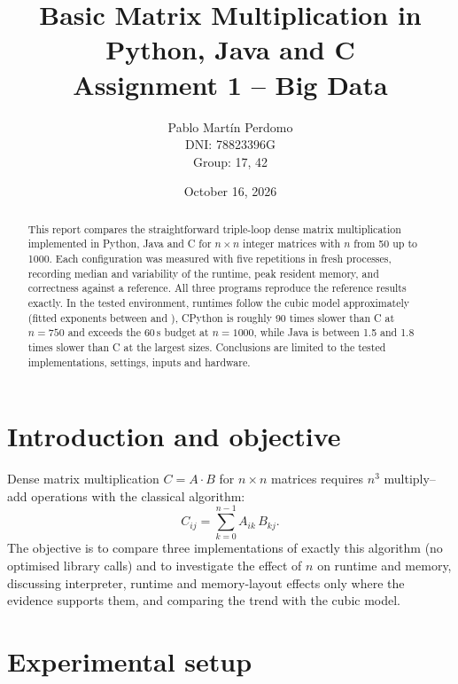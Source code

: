 \documentclass[11pt,a4paper]{article}
\title{Basic Matrix Multiplication in Python, Java and C\\
\large Assignment 1 -- Big Data}
\author{
  Pablo Mart\'in Perdomo\\
  DNI: 78823396G\\
  Group: 17, 42
}
\date{October 16, 2026}
\begin{document}
\maketitle

\begin{abstract}
This report compares the straightforward triple-loop dense matrix multiplication
implemented in Python, Java and C for $n\times n$ integer matrices with
$n$ from 50 up to 1000. Each configuration was measured with five repetitions in
fresh processes, recording median and variability of the runtime, peak resident memory,
and correctness against a reference. All three programs reproduce the
reference results exactly. In the tested environment, runtimes follow the cubic model
approximately (fitted exponents between \ExpJavaCold{} and \ExpJavaWarm{}),
CPython is roughly 90 times slower than C at $n=750$ and exceeds the 60\,s budget at $n=1000$,
while Java is between 1.5 and 1.8 times slower than C at the largest sizes.
Conclusions are limited to the tested implementations, settings, inputs and hardware.
\end{abstract}

\tableofcontents
\newpage

\section{Introduction and objective}
Dense matrix multiplication $C = A\cdot B$ for $n\times n$ matrices requires
$n^3$ multiply--add operations with the classical algorithm:
\[
  C_{ij} = \sum_{k=0}^{n-1} A_{ik}\,B_{kj}.
\]
The objective is to compare three implementations of exactly this algorithm
(no optimised library calls) and to investigate the effect of $n$ on runtime
and memory, discussing interpreter, runtime and memory-layout effects only where
the evidence supports them, and comparing the trend with the cubic model.

\section{Experimental setup}
\end{document}
